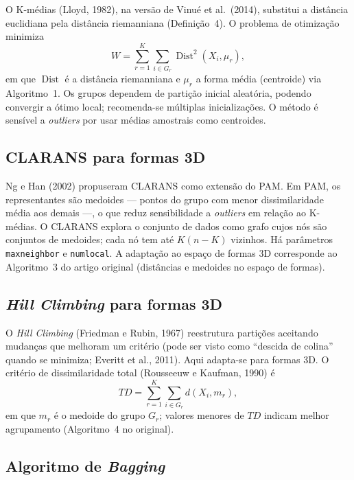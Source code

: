\documentclass[11pt,a4paper]{article}
\begin{document}
O K-médias (Lloyd, 1982), na versão de Vinué et al.\ (2014), substitui a distância euclidiana pela distância riemanniana (Definição~4). O problema de otimização minimiza
\begin{equation}
  W = \sum_{r=1}^{K} \sum_{i \in G_r} \operatorname{Dist}^2(X_i, \mu_r),
\end{equation}
em que $\operatorname{Dist}$ é a distância riemanniana e $\mu_r$ a forma média (centroide) via Algoritmo~1. Os grupos dependem de partição inicial aleatória, podendo convergir a ótimo local; recomenda-se múltiplas inicializações. O método é sensível a \emph{outliers} por usar médias amostrais como centroides.

\subsection{CLARANS para formas 3D}

Ng e Han (2002) propuseram CLARANS como extensão do PAM. Em PAM, os representantes são medoides --- pontos do grupo com menor dissimilaridade média aos demais ---, o que reduz sensibilidade a \emph{outliers} em relação ao K-médias. O CLARANS explora o conjunto de dados como grafo cujos nós são conjuntos de medoides; cada nó tem até $K(n-K)$ vizinhos. Há parâmetros \texttt{maxneighbor} e \texttt{numlocal}. A adaptação ao espaço de formas 3D corresponde ao Algoritmo~3 do artigo original (distâncias e medoides no espaço de formas).

\subsection{\emph{Hill Climbing} para formas 3D}

O \emph{Hill Climbing} (Friedman e Rubin, 1967) reestrutura partições aceitando mudanças que melhoram um critério (pode ser visto como ``descida de colina'' quando se minimiza; Everitt et al., 2011). Aqui adapta-se para formas 3D. O critério de dissimilaridade total (Rousseeuw e Kaufman, 1990) é
\begin{equation}
  TD = \sum_{r=1}^{K} \sum_{i \in G_r} d(X_i, m_r),
\end{equation}
em que $m_r$ é o medoide do grupo $G_r$; valores menores de $TD$ indicam melhor agrupamento (Algoritmo~4 no original).

\subsection{Algoritmo de \emph{Bagging}}
\end{document}
